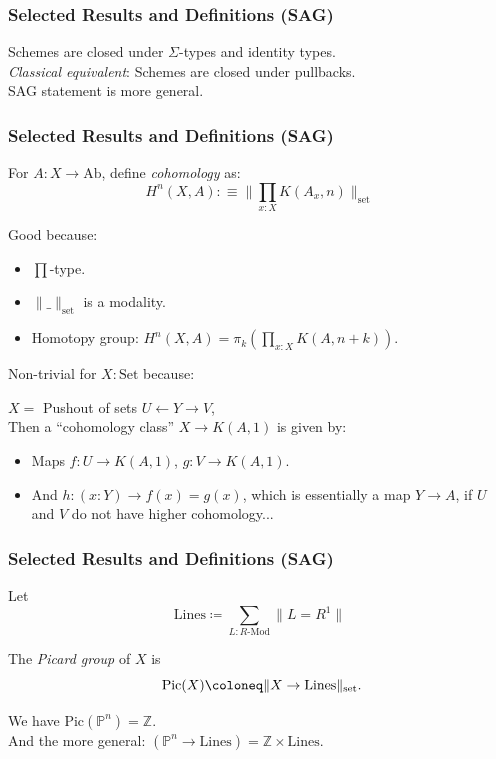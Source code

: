 \documentclass{beamer}
\begin{document}
\begin{frame}
  \frametitle{Selected Results and Definitions (SAG)}
  Schemes are closed under $\Sigma$-types and identity types. \\
  \pause
  \vspace{1cm}
  \emph{Classical equivalent}: Schemes are closed under pullbacks. \\
  \pause
  \vspace{1cm}
  SAG statement is more general. \\
  \vspace{1cm}
\end{frame}

\begin{frame}
  \frametitle{Selected Results and Definitions (SAG)}
  \vspace{0.25cm}
  For $A : X \to \mathrm{Ab}$, define \emph{cohomology} as:
  \[ H^n(X, A) :\equiv \Big\| \prod_{x:X}K(A_x,n) \Big\|_{\mathrm{set}} \]
  
  \pause
  Good because:
  \begin{itemize}
  \item $\prod$-type.
  \item $\|\_\|_{\mathrm{set}}$ is a modality.
  \item Homotopy group: $H^n(X,A)=\pi_{k}(\prod_{x:X}K(A,n+k))$.
  \end{itemize}

  \pause
  Non-trivial for $X:\mathrm{Set}$ because:

  $X=$ Pushout of sets $U\leftarrow Y\to V$, \\
  Then a ``cohomology class'' $X\to K(A,1)$ is given by:
  \begin{itemize}
  \item Maps $f:U\to K(A,1)$, $g:V\to K(A,1)$.
  \item And $h:(x:Y)\to f(x)=g(x)$, which is essentially a map $Y\to A$,
    if $U$ and $V$ do not have higher cohomology...
  \end{itemize}
\end{frame}

\begin{frame}
  \frametitle{Selected Results and Definitions (SAG)}

  Let
  \[ \mathrm{Lines} \coloneq \sum_{L : R\text{-Mod}} \lVert L = R^1 \rVert \]

  \pause
  \vspace{5mm}
  The \emph{Picard group} of $X$ is
  \[ \mathrm{Pic}(X) \coloneq \lVert X \to \mathrm{Lines} \rVert_{\text{set}} \rlap{.}\]
  
  \pause
  We have $\mathrm{Pic}(\mathbb P^n)=\mathbb Z$. \\
  \pause
  And the more general: $(\mathbb P^n \to \mathrm{Lines}) = \mathbb Z \times \mathrm{Lines}$. \\
\end{frame}
\end{document}
